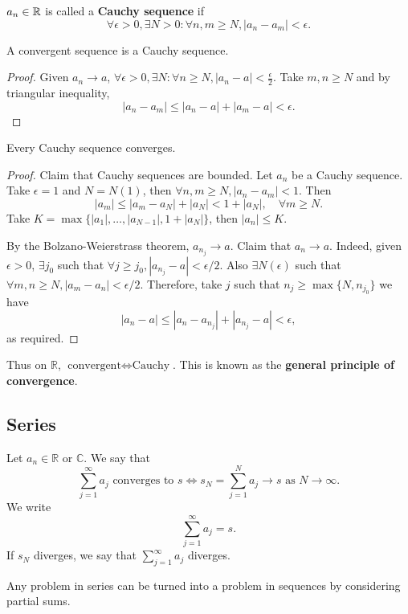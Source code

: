 \begin{definition}
    $a_n\in {\mathbb{R}}$ is called a \textbf{Cauchy sequence} if 
    \[
        \forall \epsilon>0, \exists N>0: \forall n,m\ge N, \left| a_n-a_m \right| <\epsilon.
    \]
\end{definition}

\begin{lemma}\label{lma:convergent -> cauchy}
    A convergent sequence is a Cauchy sequence.
\end{lemma}
\begin{proof}
    Given $ a_n\to a $, $ \forall \epsilon>0, \exists N: \forall n\ge N, |a_n-a|<\frac{\epsilon}{2} $. Take $m,n\ge N$ and by triangular inequality,
    \[
        |a_n-a_m|\le |a_n-a|+|a_m-a|<\epsilon.
    \]
\end{proof}

\begin{theorem}\label{thm:cauchy -> convergent}
    Every Cauchy sequence converges.
\end{theorem}
\begin{proof}
    Claim that Cauchy sequences are bounded. Let $a_n$ be a Cauchy sequence. Take $\epsilon=1$ and $N=N(1)$, then $ \forall n,m\ge N, |a_n-a_m|<1 $. Then
    \[
        |a_m|\le |a_m-a_N|+|a_N|<1+|a_N|, \quad \forall m\ge N.
    \]
    Take $ K= \max\{|a_1|,\dots,|a_{N-1}|, 1+|a_N|\} $, then $|a_n|\le K$.

    By the Bolzano-Weierstrass theorem, $ a_{n_j}\to a $. Claim that $a_n\to a$. Indeed, given $ \epsilon>0 $, $ \exists j_0 $ such that $ \forall j\ge j_0, |a_{n_j}-a|<\epsilon/2 $. Also $ \exists N(\epsilon) $ such that $ \forall m,n\ge N, |a_m-a_n|<\epsilon/2 $. Therefore, take $j$ such that $ n_j\ge \max \{N, n_{j_0}\} $ we have
    \[
        \left| a_n-a \right| \le \left| a_n-a_{n_j} \right| + \left| a_{n_j} -a\right| < \epsilon,
    \]
    as required.
\end{proof}
\begin{note}
    Thus on $ \mathbb{R} $, $ \text{convergent} \Leftrightarrow \text{Cauchy} $. This is known as the \textbf{general principle of convergence}.
\end{note}

\subsection{Series}

\begin{definition}[Series]
    Let $ a_n\in \mathbb{R} \text{ or } \mathbb{C} $. We say that 
    \[
        \sum_{j=1}^{\infty}a_j \text{ converges to } s \Longleftrightarrow s_N = \sum_{j=1}^{N} a_j \to s \text{ as }N\to \infty.
    \]
    We write 
    \[
        \sum_{j=1}^{\infty} a_j=s.
    \]
    If $s_N$ diverges, we say that $\sum_{j=1}^{\infty} a_j$ diverges.
\end{definition}
\begin{remark}
    Any problem in series can be turned into a problem in sequences by considering partial sums.
\end{remark}

